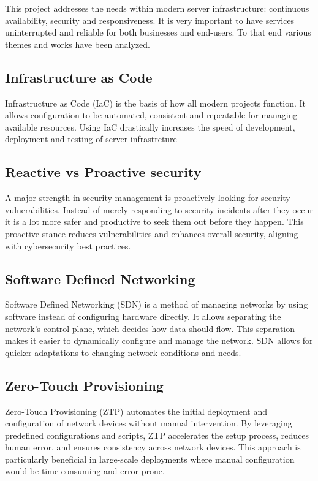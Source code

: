 This project addresses the needs within modern server infrastructure: continuous availability, security and responsiveness. It is very important to have services uninterrupted and reliable for both businesses and end-users. To that end various themes and works have been analyzed.

\subsection{Infrastructure as Code}
Infrastructure as Code (IaC) is the basis of how all modern projects function. It allows configuration to be automated, consistent and repeatable for managing available resources. Using IaC drastically increases the speed of development, deployment and testing of server infrastrcture \cite{Saxena2024DevOps, YUNGAICELANAULA202264} 

\subsection{Reactive vs Proactive security}
A major strength in security management is proactively looking for security vulnerabilities. Instead of merely responding to security incidents after they occur it is a lot more safer and productive to seek them out before they happen. This proactive stance reduces vulnerabilities and enhances overall security, aligning with cybersecurity best practices.

\subsection{Software Defined Networking}
Software Defined Networking (SDN) is a method of managing networks by using software instead of configuring hardware directly. It allows separating the network’s control plane, which decides how data should flow. This separation makes it easier to dynamically configure and manage the network. SDN allows for quicker adaptations to changing network conditions and needs.

\subsection{Zero-Touch Provisioning}
Zero-Touch Provisioning (ZTP) \cite{Watsen2019SZTP} automates the initial deployment and configuration of network devices without manual intervention. By leveraging predefined configurations and scripts, ZTP accelerates the setup process, reduces human error, and ensures consistency across network devices. This approach is particularly beneficial in large-scale deployments where manual configuration would be time-consuming and error-prone.


